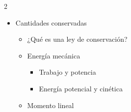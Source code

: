 \documentclass[a4paper,14pt]{extarticle}
\begin{document}
\begin{multicols}{2}
\begin{enumerate}
\begin{itemize}[leftmargin=2mm]
{\begin{itemize}[leftmargin=6mm]
 					\end{itemize}
 					}
 			
 			\item Cantidades conservadas
 					{\footnotesize
 					\begin{itemize}[leftmargin=6mm]						
 						\item ¿Qué es una ley de conservación?
 						\item Energía mecánica
 						{\footnotesize
 						\begin{itemize}[leftmargin=4mm]
 							\item Trabajo y potencia
 							\item Energía potencial y cinética
 							
 						\end{itemize}
 						}
 						\item Momento lineal
 					\end{itemize}
 					}
 				\end{itemize}
	 \end{enumerate}
\end{multicols}
\end{document}
